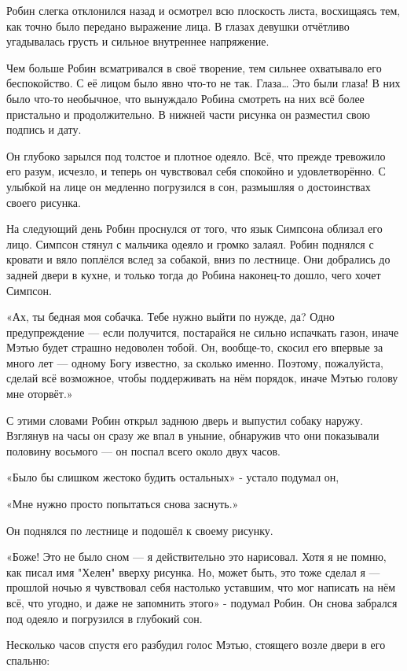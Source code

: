 \documentclass[a5paper, 9pt,
final, openany, twoside=true]{memoir}
\begin{document}
Робин слегка отклонился назад и осмотрел всю плоскость листа, восхищаясь тем, как точно было передано выражение лица. В глазах девушки отчётливо угадывалась грусть и сильное внутреннее напряжение.\bigskip

Чем больше Робин всматривался в своё творение, тем сильнее охватывало его беспокойство. С её лицом было явно что-то не так. Глаза… Это были глаза! В них было что-то необычное, что вынуждало Робина смотреть на них всё более пристально и продолжительно. В нижней части рисунка он разместил свою подпись и дату.\bigskip

Он глубоко зарылся под толстое и плотное одеяло. Всё, что прежде тревожило его разум, исчезло, и теперь он чувствовал себя спокойно и удовлетворённо. С улыбкой на лице он медленно погрузился в сон, размышляя о достоинствах своего рисунка.\bigskip

На следующий день Робин проснулся от того, что язык Симпсона облизал его лицо. Симпсон стянул с мальчика одеяло и громко залаял. Робин поднялся с кровати и вяло поплёлся вслед за собакой, вниз по лестнице. Они добрались до задней двери в кухне, и только тогда до Робина наконец-то дошло, чего хочет Симпсон.\bigskip

«Ах, ты бедная моя собачка. Тебе нужно выйти по нужде, да? Одно предупреждение — если получится, постарайся не сильно испачкать газон, иначе Мэтью будет страшно недоволен тобой. Он, вообще-то, скосил его впервые за много лет — одному Богу известно, за сколько именно. Поэтому, пожалуйста, сделай всё возможное, чтобы поддерживать на нём порядок, иначе Мэтью голову мне оторвёт.»

С этими словами Робин открыл заднюю дверь и выпустил собаку наружу. Взглянув на часы он сразу же впал в уныние, обнаружив что они показывали половину восьмого — он поспал всего около двух часов.

«Было бы слишком жестоко будить остальных» - устало подумал он,

«Мне нужно просто попытаться снова заснуть.»

Он поднялся по лестнице и подошёл к своему рисунку.

«Боже! Это не было сном — я действительно это нарисовал. Хотя я не помню, как писал имя "Хелен" вверху рисунка. Но, может быть, это тоже сделал я — прошлой ночью я чувствовал себя настолько уставшим, что мог написать на нём всё, что угодно, и даже не запомнить этого» - подумал Робин. Он снова забрался под одеяло и погрузился в глубокий сон.\bigskip

Несколько часов спустя его разбудил голос Мэтью, стоящего возле двери в его спальню:
\end{document}
